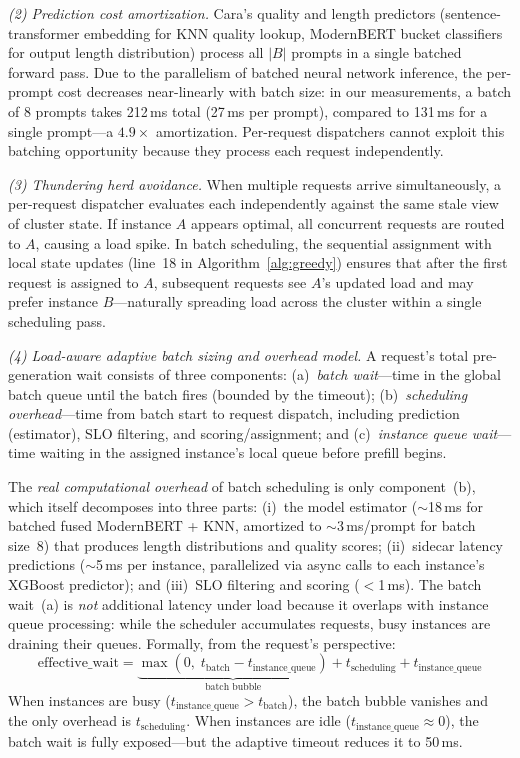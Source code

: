 \documentclass[letterpaper, anonymous, twocolumn, 10pt]{article}
\begin{document}
\emph{(2) Prediction cost amortization.}
Cara's quality and length predictors (sentence-transformer embedding for KNN quality lookup, ModernBERT bucket classifiers for output length distribution) process all $|B|$ prompts in a single batched forward pass.
Due to the parallelism of batched neural network inference, the per-prompt cost decreases near-linearly with batch size: in our measurements, a batch of 8 prompts takes 212\,ms total (27\,ms per prompt), compared to 131\,ms for a single prompt---a $4.9\times$ amortization.
Per-request dispatchers cannot exploit this batching opportunity because they process each request independently.

\emph{(3) Thundering herd avoidance.}
When multiple requests arrive simultaneously, a per-request dispatcher evaluates each independently against the same stale view of cluster state.
If instance $A$ appears optimal, all concurrent requests are routed to $A$, causing a load spike.
In batch scheduling, the sequential assignment with local state updates (line~18 in Algorithm~\ref{alg:greedy}) ensures that after the first request is assigned to $A$, subsequent requests see $A$'s updated load and may prefer instance $B$---naturally spreading load across the cluster within a single scheduling pass.

\emph{(4) Load-aware adaptive batch sizing and overhead model.}
A request's total pre-generation wait consists of three components: (a)~\emph{batch wait}---time in the global batch queue until the batch fires (bounded by the timeout); (b)~\emph{scheduling overhead}---time from batch start to request dispatch, including prediction (estimator), SLO filtering, and scoring/assignment; and (c)~\emph{instance queue wait}---time waiting in the assigned instance's local queue before prefill begins.

The \emph{real computational overhead} of batch scheduling is only component~(b), which itself decomposes into three parts: (i)~the model estimator ($\sim$18\,ms for batched fused ModernBERT + KNN, amortized to $\sim$3\,ms/prompt for batch size~8) that produces length distributions and quality scores; (ii)~sidecar latency predictions ($\sim$5\,ms per instance, parallelized via async calls to each instance's XGBoost predictor); and (iii)~SLO filtering and scoring ($<$1\,ms). The batch wait~(a) is \emph{not} additional latency under load because it overlaps with instance queue processing: while the scheduler accumulates requests, busy instances are draining their queues. Formally, from the request's perspective:
\begin{equation}
\label{eq:effective_wait}
\text{effective\_wait} = \underbrace{\max(0,\; t_{\text{batch}} - t_{\text{instance\_queue}})}_{\text{batch bubble}} + t_{\text{scheduling}} + t_{\text{instance\_queue}}
\end{equation}
When instances are busy ($t_{\text{instance\_queue}} > t_{\text{batch}}$), the batch bubble vanishes and the only overhead is $t_{\text{scheduling}}$. When instances are idle ($t_{\text{instance\_queue}} \approx 0$), the batch wait is fully exposed---but the adaptive timeout reduces it to 50\,ms.
\end{document}
